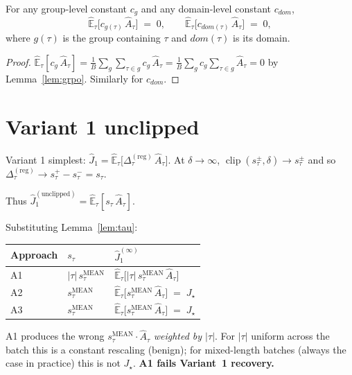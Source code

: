 \documentclass[11pt]{article}
\DeclareMathOperator*{\clip}{clip}
\newcommand{\Ehat}{\widehat{\mathbb{E}}}
\newcommand{\smean}{s^{\text{MEAN}}}
\begin{document}
\begin{lemma}
\label{lem:vanish}
For any group-level constant $c_g$ and any domain-level constant $c_{dom}$,
\[
\Ehat_\tau\bigl[c_{g(\tau)}\,\hat A_\tau\bigr] \;=\; 0,
\qquad
\Ehat_\tau\bigl[c_{dom(\tau)}\,\hat A_\tau\bigr] \;=\; 0,
\]
where $g(\tau)$ is the group containing $\tau$ and $dom(\tau)$ is its domain.
\end{lemma}
\begin{proof}
$\Ehat_\tau[c_g\,\hat A_\tau] = \tfrac{1}{B}\sum_g\sum_{\tau\in g}
c_g\,\hat A_\tau = \tfrac{1}{B}\sum_g c_g\sum_{\tau\in g}\hat A_\tau = 0$
by Lemma~\ref{lem:grpo}. Similarly for $c_{dom}$.
\end{proof}

\section{Variant 1 unclipped}

Variant 1 simplest: $\hat J_1 = \Ehat_\tau\bigl[\Delta_\tau^{(\text{reg})}\,\hat A_\tau\bigr]$.
At $\delta\to\infty$, $\clip(s_\tau^{\pm},\delta)\to s_\tau^{\pm}$ and so
$\Delta_\tau^{(\text{reg})} \to s_\tau^+ - s_\tau^- = s_\tau$.

Thus $\hat J_1^{(\text{unclipped})} = \Ehat_\tau[s_\tau\,\hat A_\tau]$.

Substituting Lemma~\ref{lem:tau}:

\begin{center}
\begin{tabular}{l l l}
\textbf{Approach} & \textbf{$s_\tau$} & \textbf{$\hat J_1^{(\infty)}$} \\ \hline
A1  & $|\tau|\,\smean_\tau$ & $\Ehat_\tau\bigl[|\tau|\,\smean_\tau\,\hat A_\tau\bigr]$ \\
A2  & $\smean_\tau$ & $\Ehat_\tau\bigl[\smean_\tau\,\hat A_\tau\bigr] \;=\; J_\star$ \\
A3  & $\smean_\tau$ & $\Ehat_\tau\bigl[\smean_\tau\,\hat A_\tau\bigr] \;=\; J_\star$ \\
\end{tabular}
\end{center}

A1 produces the wrong $\smean_\tau\cdot\hat A_\tau$ \emph{weighted by
$|\tau|$}. For $|\tau|$ uniform across the batch this is a constant
rescaling (benign); for mixed-length batches (always the case in practice)
this is not $J_\star$. \textbf{A1 fails Variant~1 recovery.}
\end{document}
